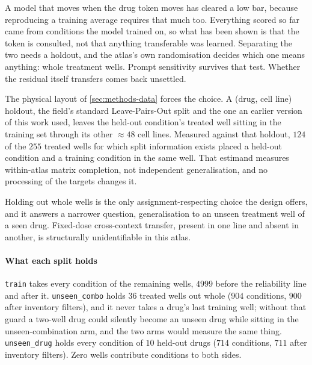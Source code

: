 \label{sec:methods-holdout}

\begin{question}[6]
A model that moves when the drug token moves has cleared a low bar, because
reproducing a training average requires that much too. Everything scored so far
came from conditions the model trained on, so what has been shown is that the
token is consulted, not that anything transferable was learned. Separating the
two needs a holdout, and the
atlas's own randomisation decides which one means anything: whole treatment
wells. Prompt sensitivity survives that test. Whether the residual itself
transfers comes back unsettled.
\end{question}

\noindent
The physical layout of \cref{sec:methods-data} forces the choice. A (drug, cell
line) holdout, the field's standard Leave-Pairs-Out split and the one an earlier
version of this work used, leaves the held-out condition's treated well sitting
in the training set through its other $\approx 48$ cell lines. Measured against
that holdout, $\num{124}$ of the $\num{255}$ treated wells for which split
information exists placed a held-out condition and a training condition in the
same well. That estimand measures within-atlas matrix completion, not independent
generalisation, and no processing of the targets changes it.

Holding out whole wells is the only assignment-respecting choice the design
offers, and it answers a narrower question, generalisation to an unseen treatment
well of a seen drug. Fixed-dose cross-context transfer, present in one line and
absent in another, is structurally unidentifiable in this atlas.

\paragraph{What each split holds} \texttt{train} takes every condition of the
remaining wells, $\num{4999}$ before the reliability line and
 after it.
\texttt{unseen\_combo} holds $\num{36}$ treated wells out whole ($\num{904}$
conditions, $\num{900}$ after inventory filters), and it never takes a drug's
last training well; without that guard a two-well drug could silently become an
unseen drug while sitting in the unseen-combination arm, and the two arms would
measure the same thing. \texttt{unseen\_drug} holds every condition of
$\num{10}$ held-out drugs ($\num{714}$ conditions, $\num{711}$ after inventory
filters). Zero wells contribute conditions to both sides.

